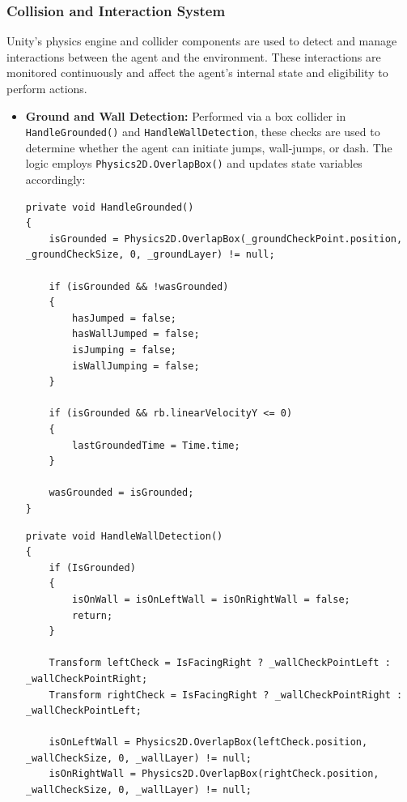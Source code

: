 \documentclass[12pt,oneside,openright,a4paper]{cpe-english-project}
\begin{document}
\subsubsection{Collision and Interaction System}
Unity’s physics engine and collider components are used to detect and manage interactions between the agent and the environment. These interactions are monitored continuously and affect the agent’s internal state and eligibility to perform actions.
\begin{itemize}
\item  \textbf{Ground and Wall Detection:} Performed via a box collider in \texttt{HandleGrounded()} and \texttt{HandleWallDetection}, these checks are used to determine whether the agent can initiate jumps, wall-jumps, or dash. The logic employs \texttt{Physics2D.OverlapBox()} and updates state variables accordingly:

\begin{lstlisting}[language={[Sharp]C}]
private void HandleGrounded()
{
	isGrounded = Physics2D.OverlapBox(_groundCheckPoint.position, _groundCheckSize, 0, _groundLayer) != null;

	if (isGrounded && !wasGrounded)
	{
		hasJumped = false;
		hasWallJumped = false;
		isJumping = false;
		isWallJumping = false;
	}

	if (isGrounded && rb.linearVelocityY <= 0)
	{
		lastGroundedTime = Time.time;
	}

	wasGrounded = isGrounded;
}
\end{lstlisting}
\begin{lstlisting}[language={[Sharp]C}]
private void HandleWallDetection()
{
	if (IsGrounded)
	{
		isOnWall = isOnLeftWall = isOnRightWall = false;
		return;
	}

	Transform leftCheck = IsFacingRight ? _wallCheckPointLeft : _wallCheckPointRight;
	Transform rightCheck = IsFacingRight ? _wallCheckPointRight : _wallCheckPointLeft;

	isOnLeftWall = Physics2D.OverlapBox(leftCheck.position, _wallCheckSize, 0, _wallLayer) != null;
	isOnRightWall = Physics2D.OverlapBox(rightCheck.position, _wallCheckSize, 0, _wallLayer) != null;


\end{lstlisting}
\end{itemize}
\end{document}
